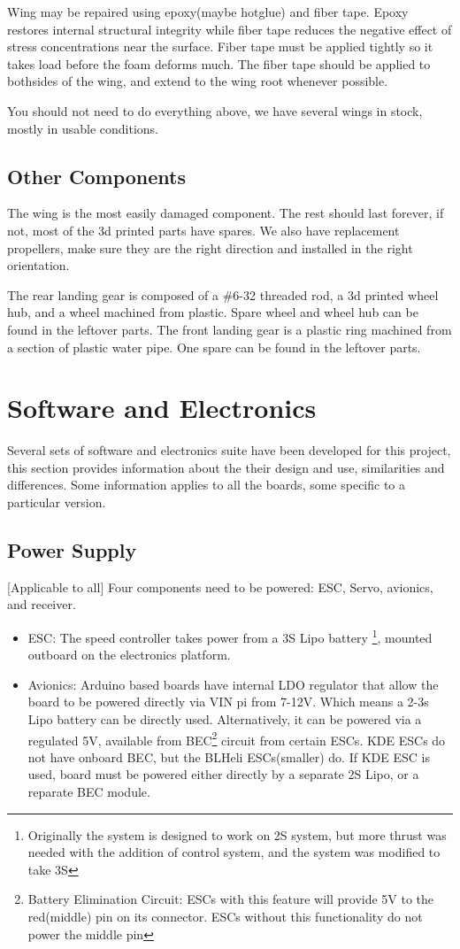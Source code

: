 \documentclass[12pt]{article}
\begin{document}
Wing may be repaired using epoxy(maybe hotglue) and fiber tape. Epoxy restores internal structural integrity while fiber tape reduces the negative effect of stress concentrations near the surface. Fiber tape must be applied tightly so it takes load before the foam deforms much. The fiber tape should be applied to bothsides of the wing, and extend to the wing root whenever possible. 

You should not need to do everything above, we have several wings in stock, mostly in usable conditions. 

\subsection{Other Components}
The wing is the most easily damaged component. The rest should last forever, if not, most of the 3d printed parts have spares. We also have replacement propellers, make sure they are the right direction and installed in the right orientation.

The rear landing gear is composed of a \#6-32 threaded rod, a 3d printed wheel hub, and a wheel machined from plastic. Spare wheel and wheel hub can be found in the leftover parts. The front landing gear is a plastic ring machined from a section of plastic water pipe. One spare can be found in the leftover parts. 


\section{Software and Electronics}
Several sets of software and electronics suite have been developed for this project, this section provides information about the their design and use, similarities and differences. Some information applies to all the boards, some specific to a particular version.

\subsection{Power Supply}
[Applicable to all] Four components need to be powered: ESC, Servo, avionics, and receiver. 
\begin{itemize}
  \item ESC: The speed controller takes power from a 3S Lipo battery \footnote{Originally the system is designed to work on 2S system, but more thrust was needed with the addition of control system, and the system was modified to take 3S}, mounted outboard on the electronics platform. 
  \item Avionics: Arduino based boards have internal LDO regulator that allow the board to be powered directly via VIN pi from 7-12V. Which means a 2-3s Lipo battery can be directly used. Alternatively, it can be powered via a regulated 5V, available from BEC\footnote{Battery Elimination Circuit: ESCs with this feature will provide 5V to the red(middle) pin on its connector. ESCs without this functionality do not power the middle pin} circuit from certain ESCs. KDE ESCs do not have onboard BEC, but the BLHeli ESCs(smaller) do. If KDE ESC is used, board must be powered either directly by a separate 2S Lipo, or a reparate BEC module.  
\end{itemize}
\end{document}
